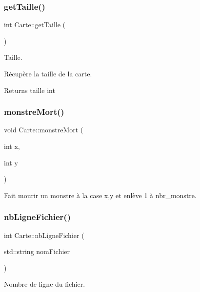 \subsubsection{\texorpdfstring{get\+Taille()}{getTaille()}}
{\footnotesize\ttfamily int Carte\+::get\+Taille (\begin{DoxyParamCaption}{ }\end{DoxyParamCaption})\hspace{0.3cm}{\ttfamily [inline]}}



Taille. 

Récupère la taille de la carte.

\begin{DoxyReturn}{Returns}
taille int 
\end{DoxyReturn}
\mbox{\label{class_carte_a80fa02e7f8da63b43c62e454082923b4}} 
\subsubsection{\texorpdfstring{monstre\+Mort()}{monstreMort()}}
{\footnotesize\ttfamily void Carte\+::monstre\+Mort (\begin{DoxyParamCaption}\item[{int}]{x,  }\item[{int}]{y }\end{DoxyParamCaption})}



Fait mourir un monstre à la case x,y et enlève 1 à nbr\+\_\+monstre. 

\mbox{\label{class_carte_a2cd533b7b1a04298a19e7eef566bc7f1}} 
\subsubsection{\texorpdfstring{nb\+Ligne\+Fichier()}{nbLigneFichier()}}
{\footnotesize\ttfamily int Carte\+::nb\+Ligne\+Fichier (\begin{DoxyParamCaption}\item[{std\+::string}]{nom\+Fichier }\end{DoxyParamCaption})}



Nombre de ligne du fichier. 

